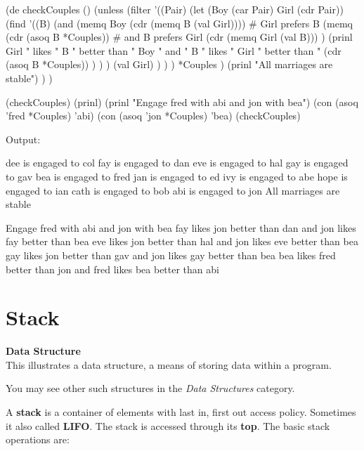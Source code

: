 \begin{wideverbatim}


(de checkCouples ()
   (unless
      (filter
         '((Pair)
            (let (Boy (car Pair)  Girl (cdr Pair))
               (find
                  '((B)
                     (and
                        (memq Boy (cdr (memq B (val Girl))))  # Girl prefers B
                        (memq
                           (cdr (asoq B *Couples))            # and B prefers Girl
                           (cdr (memq Girl (val B))) )
                        (prinl
                           Girl " likes " B " better than " Boy " and "
                           B " likes " Girl " better than "
                           (cdr (asoq B *Couples)) ) ) )
                  (val Girl) ) ) )
         *Couples )
      (prinl "All marriages are stable") ) )

(checkCouples)
(prinl)
(prinl "Engage fred with abi and jon with bea")
(con (asoq 'fred *Couples) 'abi)
(con (asoq 'jon *Couples) 'bea)
(checkCouples)

Output:

dee is engaged to col
fay is engaged to dan
eve is engaged to hal
gay is engaged to gav
bea is engaged to fred
jan is engaged to ed
ivy is engaged to abe
hope is engaged to ian
cath is engaged to bob
abi is engaged to jon
All marriages are stable

Engage fred with abi and jon with bea
fay likes jon better than dan and jon likes fay better than bea
eve likes jon better than hal and jon likes eve better than bea
gay likes jon better than gav and jon likes gay better than bea
bea likes fred better than jon and fred likes bea better than abi

\end{wideverbatim}

\pagebreak{}
\section*{Stack}

\textbf{Data Structure}\\ This illustrates a data structure, a means of
storing data within a program.

You may see other such structures in the
\emph{Data Structures} category.

A \textbf{stack} is a container of elements with last in, first out
access policy. Sometimes it also called \textbf{LIFO}. The stack is
accessed through its \textbf{top}. The basic stack operations are:

